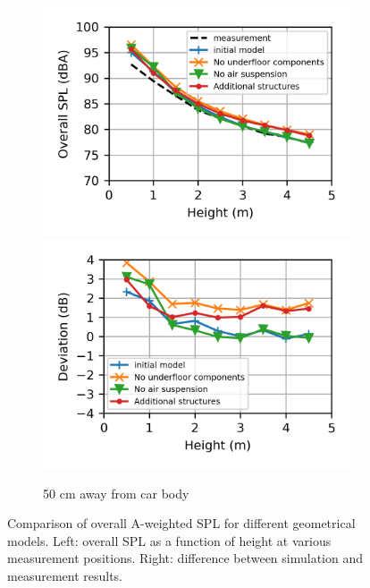 \begin{figure}[H]
\begin{subfigure}[b]{\textwidth}
		\includegraphics{fig/chap5/geometry_variation/overall_SPL/pos_f.png}
		\hfill
		\includegraphics{fig/chap5/geometry_variation/overall_SPL/pos_f_deviation.png}
		\caption{50 cm away from car body}
	\end{subfigure}
	\caption{Comparison of overall A-weighted SPL for different geometrical models. Left: overall SPL as a function of height at various measurement positions. Right: difference between simulation and measurement results.}
	\label{fig:overall_SPL_geometry}
\end{figure}

